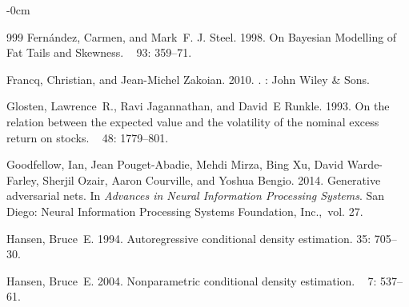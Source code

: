 \documentclass[risks,article,accept,pdftex,moreauthors]{Definitions/mdpi}
\begin{document}
\begin{adjustwidth}{-\extralength}{0cm}
\begin{thebibliography}{999}
Fern{\'a}ndez, Carmen, and Mark~F. J. Steel. 1998.
\newblock On Bayesian Modelling of Fat Tails and Skewness.
~{ 93\/}: 359--71.

Francq, Christian, and Jean-Michel Zakoian. 2010.
.
: 
John Wiley \& Sons.

Glosten, Lawrence~R., Ravi Jagannathan, and David~E Runkle. 1993.
\newblock On the relation between the expected value and the volatility of the
  nominal excess return on stocks.
~{ 48\/}: 1779--801.

Goodfellow, Ian, Jean Pouget-Abadie, Mehdi Mirza, Bing Xu, David Warde-Farley,
  Sherjil Ozair, Aaron Courville, and Yoshua Bengio. 2014.
\newblock Generative adversarial nets.
\newblock In {\em Advances in Neural Information Processing Systems\/}. {San Diego: Neural Information Processing Systems Foundation, Inc.,}~{vol. 27}.

Hansen, Bruce~E. 1994.
\newblock Autoregressive conditional density estimation.
 {35:} 705--30.

Hansen, Bruce~E. 2004.
\newblock Nonparametric conditional density estimation.
~{ 7\/}: 537--61.


\end{thebibliography}
\end{adjustwidth}
\end{document}
